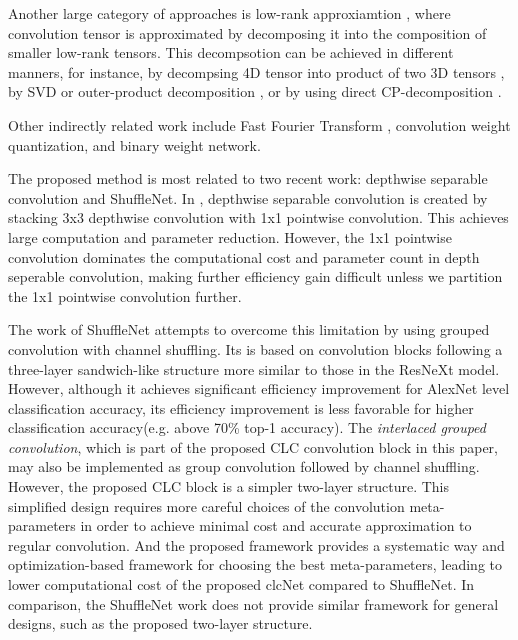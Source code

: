 \documentclass[10pt,twocolumn,letterpaper]{article}
\begin{document}
Another large category of approaches is low-rank approxiamtion \cite{lowrank2014denton}\cite{lowrank2014jaderberg}\cite{lowrank2014labedev}, where convolution tensor is approximated by decomposing it into the composition of smaller low-rank tensors. This decompsotion can be achieved in different manners, for instance, by decompsing 4D tensor into product of two 3D tensors \cite{lowrank2014jaderberg}, by SVD or outer-product decomposition \cite{lowrank2014denton}, or by using direct CP-decomposition \cite{lowrank2014labedev}. 

Other indirectly related work include Fast Fourier Transform \cite{fft2017mathieu}, convolution weight quantization\cite{compression2015song}, and binary weight network\cite{bin_net2016rastegari}.

The proposed method is most related  to two recent work: depthwise separable convolution \cite{xception2017chollet}\cite{mobilenet2017howard}\cite{depth_separable2016wang} and ShuffleNet\cite{shufflenet2017xiangyu}. In  \cite{xception2017chollet}\cite{mobilenet2017howard}, depthwise separable convolution is created by stacking 3x3 depthwise convolution with 1x1 pointwise convolution. This achieves large computation and parameter reduction. However, the 1x1 pointwise convolution dominates the computational cost and parameter count in depth seperable convolution, making further efficiency gain difficult unless we partition the 1x1 pointwise convolution further. 

The work of ShuffleNet\cite{shufflenet2017xiangyu} attempts to overcome this limitation by using grouped convolution with channel shuffling. Its is based on convolution blocks following a three-layer sandwich-like structure more similar to those in the ResNeXt\cite{resnext2016saining} model. However, although it achieves significant efficiency improvement for AlexNet\cite{alexnet2012krizhevsky} level classification accuracy, its efficiency improvement is less favorable for higher classification accuracy(e.g. above 70\% top-1 accuracy). The \textit{interlaced grouped convolution}, which is part of the proposed CLC convolution block in this paper, may also be implemented as group convolution followed by channel shuffling. However, the proposed CLC block is a simpler two-layer structure. This simplified design requires more careful choices of the convolution meta-parameters in order to achieve minimal cost and accurate approximation to regular convolution. And the proposed framework provides a systematic way and optimization-based framework for choosing the best meta-parameters, leading to lower computational cost of the proposed clcNet compared to ShuffleNet. In comparison, the ShuffleNet work does not provide similar framework for general designs, such as the proposed two-layer structure.
\end{document}
